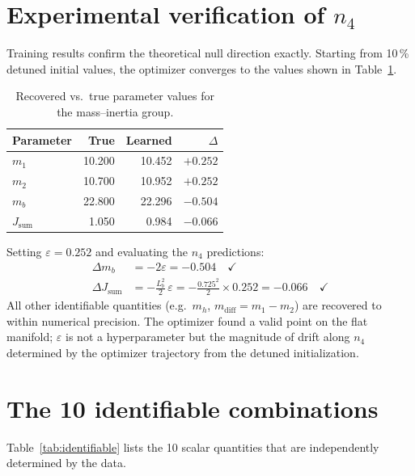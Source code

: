 \documentclass[11pt,a4paper]{article}
\begin{document}
\section{Experimental verification of $n_4$}

Training results confirm the theoretical null direction exactly.
Starting from 10\,\% detuned initial values, the optimizer converges to
the values shown in Table~\ref{tab:verification}.

\begin{table}[h]
\centering
\caption{Recovered vs.\ true parameter values for the mass--inertia group.}
\label{tab:verification}
\begin{tabular}{lrrr}
\toprule
Parameter & True & Learned & $\Delta$ \\
\midrule
$m_1$           & 10.200 & 10.452 & $+0.252$ \\
$m_2$           & 10.700 & 10.952 & $+0.252$ \\
$m_b$           & 22.800 & 22.296 & $-0.504$ \\
$J_\mathrm{sum}$& \phantom{0}1.050  & \phantom{0}0.984  & $-0.066$ \\
\bottomrule
\end{tabular}
\end{table}

Setting $\varepsilon = 0.252$ and evaluating the $n_4$ predictions:
\begin{align}
    \Delta m_b &= -2\varepsilon = -0.504 \quad \checkmark \\[4pt]
    \Delta J_\mathrm{sum} &=
        -\frac{L_b^2}{2}\,\varepsilon
        = -\frac{0.725^2}{2}\times 0.252
        = -0.066 \quad \checkmark
\end{align}
All other identifiable quantities (e.g.\ $m_h$,
$m_\mathrm{diff} = m_1 - m_2$) are recovered to within numerical
precision.
The optimizer found a valid point on the flat manifold; $\varepsilon$ is
not a hyperparameter but the magnitude of drift along $n_4$ determined by
the optimizer trajectory from the detuned initialization.

\section{The 10 identifiable combinations}

Table~\ref{tab:identifiable} lists the 10 scalar quantities that are
independently determined by the data.
\end{document}
